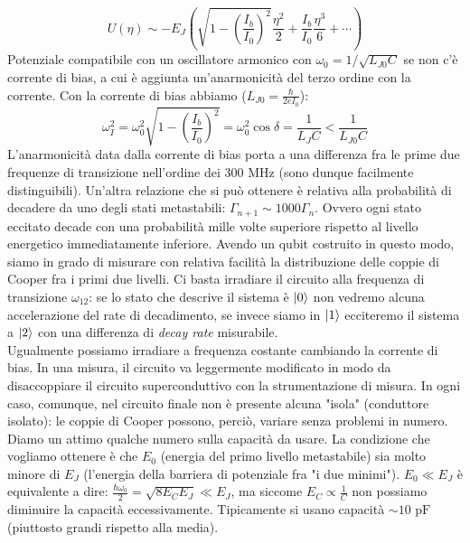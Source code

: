 \begin{equation*}
    U(\eta) \sim -E_J \left( \sqrt{1 - \left( \frac{I_b}{I_0}\right)^2}\frac{\eta^2}{2}+ \frac{I_b}{I_0} \frac{\eta^3}{6}+\cdots \right)
\end{equation*}
Potenziale compatibile con un oscillatore armonico con $\omega_0 = 1/\sqrt{L_{J0}C}$ se non c'è corrente di bias, a cui è aggiunta un'anarmonicità del terzo ordine con la corrente. Con la corrente di bias abbiamo ($L_{J0}= \frac{\hbar}{2eI_0}$):
\begin{equation*}
    \omega_I^2 = \omega_0 ^ 2 \sqrt{1 - \left( \frac{I_b}{I_0}\right) ^ 2} = \omega_0 ^2 \cos \delta = \frac{1}{L_J C} < \frac{1}{L_{J0}C}
\end{equation*}
L'anarmonicità data dalla corrente di bias porta a una differenza fra le prime due frequenze di transizione nell'ordine dei $300\text{ MHz}$ (sono dunque facilmente distinguibili).
Un'altra relazione che si può ottenere è relativa alla probabilità di decadere da uno degli stati metastabili: $\Gamma_{n+1} \sim 1000 \Gamma_n$. Ovvero ogni stato eccitato decade con una probabilità mille volte superiore rispetto al livello energetico immediatamente inferiore.
Avendo un qubit costruito in questo modo, siamo in grado di misurare con relativa facilità la distribuzione delle coppie di Cooper fra i primi due livelli. Ci basta irradiare il circuito alla frequenza di transizione $\omega_{12}$: se lo stato che descrive il sistema è $\ket 0$ non vedremo alcuna accelerazione del rate di decadimento, se invece siamo in $\ket 1$ ecciteremo il sistema a $\ket 2$ con una differenza di \textit{decay rate} misurabile. \\
Ugualmente possiamo irradiare a frequenza costante cambiando la corrente di bias.
In una misura, il circuito va leggermente modificato in modo da disaccoppiare il circuito superconduttivo con la strumentazione di misura. In ogni caso, comunque, nel circuito finale non è presente alcuna "isola" (conduttore isolato): le coppie di Cooper possono, perciò, variare senza problemi in numero.
Diamo un attimo qualche numero sulla capacità da usare. La condizione che vogliamo ottenere è che $E_0$ (energia del primo livello metastabile) sia molto minore di $E_J$ (l'energia della barriera di potenziale fra "i due minimi"). $E_0 \ll E_J$ è equivalente a dire: $\frac{\hbar \omega_0}{2}= \sqrt{8 E_C E_J} \ll E_J$, ma siccome $E_C \propto \frac{1}{C}$ non possiamo diminuire la capacità eccessivamente. Tipicamente si usano capacità $\sim 10\text{ pF}$ (piuttosto grandi rispetto alla media).

